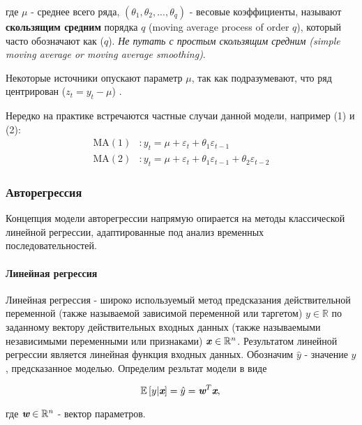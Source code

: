 где $\mu$ - среднее всего ряда, $(\theta_1, \theta_2, ..., \theta_q)$ - 
весовые коэффициенты, называют \textbf{скользящим средним} порядка $q$ 
(moving average process of order $q$), который часто 
обозначают как ($q$). \textit{Не путать с простым 
скользящим средним (simple moving average or moving average smoothing)}.

Некоторые источники опускают параметр $\mu$, так как подразумевают, что ряд 
центрирован ($z_t = y_t - \mu$) \cite{TSA_Box}.

Нередко на практике встречаются частные случаи данной модели, например (1) и 
(2):
\begin{align*}
    \text{MA}(1) &: y_t = \mu + \varepsilon_t + \theta_1 \varepsilon_{t-1} \\
    \text{MA}(2) &: y_t = \mu + \varepsilon_t + \theta_1 \varepsilon_{t-1} + \theta_2 \varepsilon_{t-2}
\end{align*}

\subsubsection{Авторегрессия}

Концепция модели авторегрессии напрямую опирается 
на методы классической линейной регрессии, адаптированные под 
анализ временных последовательностей.

\paragraph{Линейная регрессия}

Линейная регрессия - широко используемый метод предсказания действительной 
переменной (также называемой зависимой переменной или таргетом) $y \in \mathbb{R}$ 
по заданному вектору действительных входных данных (также называемыми 
независимыми переменными или признаками) $\textbf{\textit{x}} \in \mathbb{R}^n$. Результатом 
линейной регрессии является линейная функция входных данных. Обозначим $\hat{y}$ - 
значение $y$, предсказанное моделью. Определим резльтат модели в виде

\begin{equation*}
    \mathbb{E} \left[ y | \textit{\textbf{x}} \right] = \hat{y} = 
    \textit{\textbf{w}}^T \textit{\textbf{x}}, \\
\end{equation*}

где $\textit{\textbf{w}} \in \mathbb{R}^n$ - вектор параметров. 


